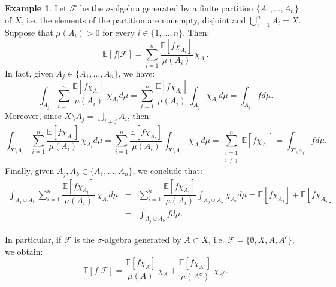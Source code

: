 \documentclass[a4paper]{article}
\theoremstyle{plain}
\theoremstyle{definition}
\newtheorem{example} [theorem]{Example}
\begin{document}
	\begin{example}
		Let $\mathcal{F}$ be the $\sigma$-algebra generated by a finite partition $\{A_{1},\dots,A_{n}\}$ of $X$, i.e. the elements of the partition are nonempty, disjoint and $\bigcup_{i=1}^{n}A_{i} = X$. Suppose that $\mu(A_{i}) > 0$ for every $i \in \{1,\dots,n\}$. Then:
		\begin{equation*}
			\mathbb{E}[f|\mathcal{F}] = \sum\limits_{i=1}^{n}\dfrac{\mathbb{E}[f\chi_{A_{i}}]}{\mu(A_{i})}\,\chi_{A_{i}}.
		\end{equation*}
		In fact, given $A_{j} \in \{A_{1},\dots,A_{n}\}$, we have:
		\begin{equation*}
			\int_{A_{j}}\sum\limits_{i=1}^{n}\dfrac{\mathbb{E}[f\chi_{A_{i}}]}{\mu(A_{i})}\,\chi_{A_{i}} d\mu = \sum\limits_{i=1}^{n}\dfrac{\mathbb{E}[f\chi_{A_{i}}]}{\mu(A_{i})}\int_{A_{j}}\chi_{A_{i}} d\mu = \int_{A_{j}}f d\mu.
		\end{equation*}
		Moreover, since $X \setminus A_{j} = \bigcup_{i \neq j}A_{i}$, then:
		\begin{equation*}
			\int_{X \setminus A_{j}}\sum\limits_{i=1}^{n}\dfrac{\mathbb{E}[f\chi_{A_{i}}]}{\mu(A_{i})}\,\chi_{A_{i}} d\mu = \sum\limits_{i=1}^{n}\dfrac{\mathbb{E}[f\chi_{A_{i}}]}{\mu(A_{i})}\int_{X \setminus A_{j}}\chi_{A_{i}} d\mu = \sum\limits_{\substack{i=1\\i\neq j}}^{n}\mathbb{E}[f\chi_{A_{i}}] = \int_{X \setminus A_{j}}f d\mu.
		\end{equation*}
		Finally, given $A_{j}, A_{k} \in \{A_{1},\dots,A_{n}\}$, we conclude that:
		\begin{eqnarray*}
			\int_{A_{j} \cup A_{k}}\sum\limits_{i=1}^{n}\dfrac{\mathbb{E}[f\chi_{A_{i}}]}{\mu(A_{i})}\,\chi_{A_{i}} d\mu &=& \sum\limits_{i=1}^{n}\dfrac{\mathbb{E}[f\chi_{A_{i}}]}{\mu(A_{i})}\int_{A_{j} \cup A_{k}}\chi_{A_{i}} d\mu = \mathbb{E}[f\chi_{A_{j}}] + \mathbb{E}[f\chi_{A_{k}}]\\
			&=& \int_{A_{j} \cup A_{k}}f d\mu.
		\end{eqnarray*}
		
		\noindent In particular, if $\mathcal{F}$ is the $\sigma$-algebra generated by $A \subset X$, i.e. $\mathcal{F} = \{\emptyset,X,A,A^{c}\}$, we obtain:
		\begin{equation*}
			\mathbb{E}[f|\mathcal{F}] = \dfrac{\mathbb{E}[f\chi_{A}]}{\mu(A)}\,\chi_{A} + \dfrac{\mathbb{E}[f\chi_{A^{c}}]}{\mu(A^{c})}\,\chi_{A^{c}}.
		\end{equation*}
	\end{example}
 
\end{document}

